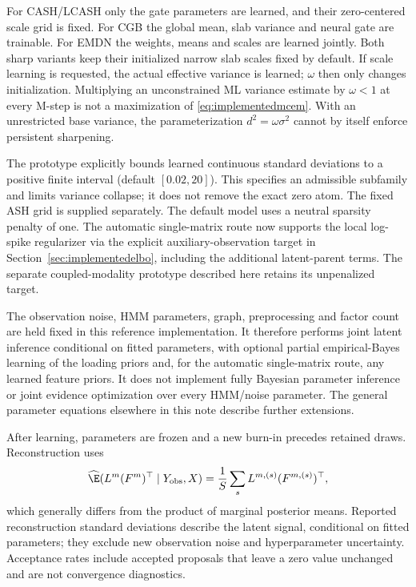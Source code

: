 For CASH/LCASH only the gate parameters are learned, and their zero-centered
scale grid is fixed. For CGB the global mean, slab variance and neural gate
are trainable. For EMDN the weights, means and scales are learned jointly.
Both sharp variants keep their initialized narrow slab scales fixed by
default. If scale learning is requested, the actual effective variance is
learned; \(\omega\) then only changes initialization. Multiplying an
unconstrained ML variance estimate by \(\omega<1\) at every M-step is not a
maximization of \eqref{eq:implementedmcem}. With an unrestricted base
variance, the parameterization \(d^2=\omega\sigma^2\) cannot by itself
enforce persistent sharpening.

The prototype explicitly bounds learned continuous standard deviations
to a positive finite interval (default \([0.02,20]\)). This specifies an
admissible subfamily and limits variance collapse; it does not remove
the exact zero atom. The fixed ASH grid is supplied separately.
The default model uses a neutral sparsity penalty of one. The automatic
single-matrix route now supports the local log-spike regularizer via the
explicit auxiliary-observation target in Section~\ref{sec:implementedelbo},
including the additional latent-parent terms. The separate coupled-modality
prototype described here retains its unpenalized target.

The observation noise, HMM parameters, graph, preprocessing and factor
count are held fixed in this reference implementation. It therefore
performs joint latent inference conditional on fitted parameters, with
optional partial empirical-Bayes learning of the loading priors and, for
the automatic single-matrix route, any learned feature priors. It does
not implement fully Bayesian parameter inference or joint evidence
optimization over every HMM/noise parameter. The general parameter
equations elsewhere in this note describe further extensions.

After learning, parameters are frozen and a new burn-in precedes retained
draws. Reconstruction uses
\[
\widehat{\E}(L^m(F^m)^\top\mid Y_{\rm obs},X)
=\frac1S\sum_sL^{m,(s)}(F^{m,(s)})^\top,
\]
which generally differs from the product of marginal posterior means.
Reported reconstruction standard deviations describe the latent signal,
conditional on fitted parameters; they exclude new observation noise and
hyperparameter uncertainty. Acceptance rates include accepted proposals
that leave a zero value unchanged and are not convergence diagnostics.




